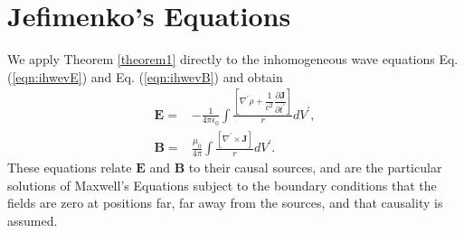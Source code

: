\documentclass[11pt]{article}              %
\begin{document}
\section[Jefimenko's Equations]{Jefimenko's Equations
   }\label{section2.2}
We apply Theorem \ref{theorem1} directly to the inhomogeneous wave equations Eq. (\ref{eqn:ihwevE}) and Eq. (\ref{eqn:ihwevB}) and obtain
\begin{align}
    {\mathbf E}=&-\frac{1}{4\pi\epsilon_0}\int\frac{\left[\nabla^\prime\rho+\dfrac{1}{c^2}\dfrac{\partial {\mathbf J}}{\partial t^\prime}\right]}{r}dV^\prime,\label{eqn:retardedE}\\
    {\mathbf B}=&\frac{\mu_0}{4\pi}\int\frac{[\nabla^\prime\times{\mathbf J}]}{r}dV^\prime.\label{eqn:retardedB}
\end{align}
These equations relate ${\mathbf E}$ and ${\mathbf B}$ to their causal sources, and are the particular solutions of Maxwell's Equations subject to the boundary conditions that the fields are zero at positions far, far away from the sources, and that causality is assumed. 
\end{document}
